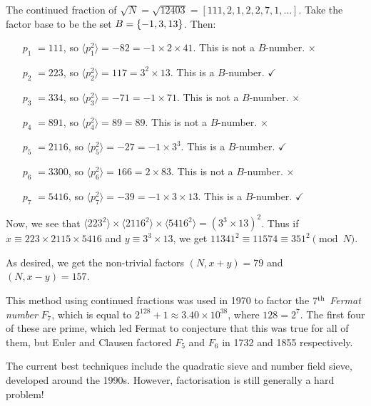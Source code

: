 \documentclass{article}
\begin{document}
\begin{example}[Factorising 12403]
    The continued fraction of $\sqrt{N} = \sqrt{12403} = [111, 2, 1, 2, 2, 7, 1, \dots]$. Take the factor base to be the set $B = \left\lbrace -1, 3, 13 \right\rbrace$. Then:
    \begin{enumerate}
	    \item[$p_1$] $= 111$, so $\langle p_1^2 \rangle = -82 = -1 \times 2 \times 41$. This is not a $B$-number. \hfill $\times$
	    \item[$p_2$] $= 223$, so $\langle p_2^2 \rangle = 117 = 3^2 \times 13$. This is a $B$-number. \hfill $\checkmark$
	    \item[$p_3$] $= 334$, so $\langle p_3^2 \rangle = -71 = -1 \times 71$. This is not a $B$-number. \hfill $\times$
	    \item[$p_4$] $= 891$, so $\langle p_4^2 \rangle = 89 = 89$. This is not a $B$-number. \hfill $\times$
	    \item[$p_5$] $= 2116$, so $\langle p_5^2 \rangle = -27 = -1 \times 3^3$. This is a $B$-number. \hfill $\checkmark$
	    \item[$p_6$] $= 3300$, so $\langle p_6^2 \rangle = 166 = 2 \times 83$. This is not a $B$-number. \hfill $\times$
	    \item[$p_7$] $= 5416$, so $\langle p_7^2 \rangle = -39 = -1 \times 3 \times 13$. This is a $B$-number. \hfill $\checkmark$
	\end{enumerate}
	Now, we see that $\langle 223^2 \rangle \times \langle 2116^2 \rangle \times \langle 5416^2 \rangle = (3^3 \times 13)^2$. Thus if $x \equiv 223 \times 2115 \times 5416$ and $y \equiv 3^3 \times 13$, we get $11341^2 \equiv 11574 \equiv 351^2 \pmod N$.
	
	As desired, we get the non-trivial factors $(N, x+y) = 79$ and $(N, x-y) = 157$.
\end{example}

\begin{note}
	This method using continued fractions was used in 1970 to factor the $7^{\text{th}}$ \textit{Fermat number} $F_7$, which is equal to $2^{128} + 1 \approx 3.40 \times 10^{38}$, where $128 = 2^7$. The first four of these are prime, which led Fermat to conjecture that this was true for all of them, but Euler and Clausen factored $F_5$ and $F_6$ in 1732 and 1855 respectively.
\end{note}

The current best techniques include the quadratic sieve and number field sieve, developed around the 1990s. However, factorisation is still generally a hard problem!
\end{document}
